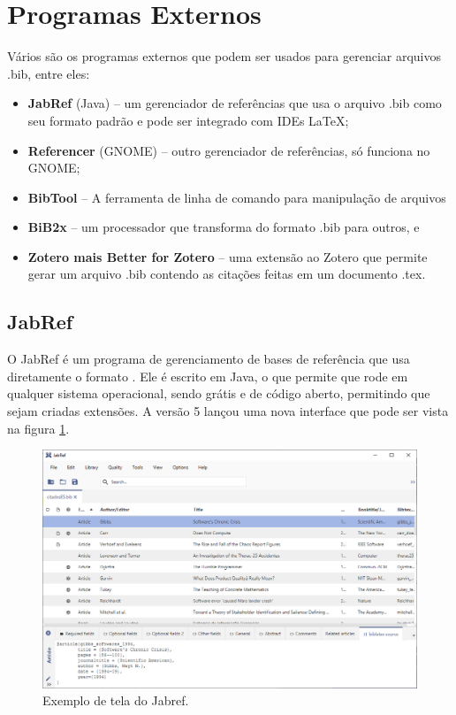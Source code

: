 \section{Programas Externos}

Vários são os programas externos que podem ser usados
para gerenciar arquivos .bib, entre eles:

\begin{itemize}
    \item \textbf{JabRef} (Java) -- um gerenciador de referências que usa o arquivo .bib como seu formato padrão e pode ser integrado com IDEs \LaTeX;
    \item \textbf{Referencer} (GNOME) -- outro gerenciador de referências, só funciona no GNOME;
    \item \textbf{BibTool} -- A ferramenta de linha de comando para manipulação de arquivos 
    \item \textbf{BiB2x}  -- um processador que transforma do formato .bib para outros, e
    \item \textbf{Zotero mais Better  for Zotero} -- uma extensão ao Zotero que permite gerar um arquivo .bib contendo as citações feitas em um documento .tex.
\end{itemize}


\subsection{JabRef}
O JabRef é um programa de gerenciamento de bases de referência que usa diretamente o formato . Ele é escrito em Java, o que permite que rode em qualquer sistema operacional, sendo grátis e de código aberto, permitindo que sejam criadas extensões. A versão 5 lançou uma nova interface que pode ser vista na figura \ref{fig:jabref}.

\begin{figure}[hbt]
    \centering
    \includegraphics[width=0.7\linewidth]{Images/jabref}
    \caption{Exemplo de tela do Jabref.}
    \label{fig:jabref}
\end{figure}  



